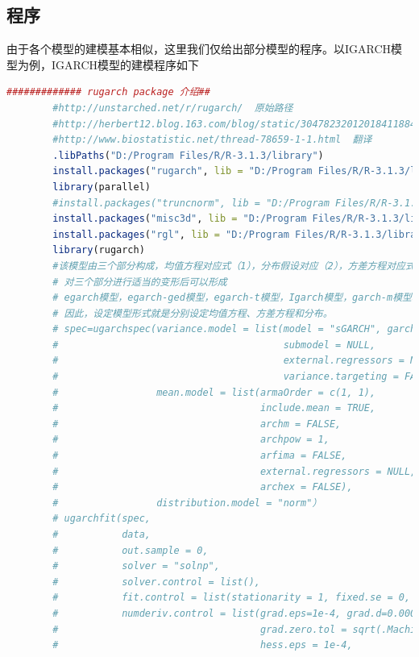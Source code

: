     \subsection{程序}
        由于各个模型的建模基本相似，这里我们仅给出部分模型的程序。以IGARCH模型为例，IGARCH模型的建模程序如下
        \begin{lstlisting}[language = R]
        ############# rugarch package 介绍##
        #http://unstarched.net/r/rugarch/  原始路径
        #http://herbert12.blog.163.com/blog/static/304782320120184118846/
        #http://www.biostatistic.net/thread-78659-1-1.html  翻译
        .libPaths("D:/Program Files/R/R-3.1.3/library")
        install.packages("rugarch", lib = "D:/Program Files/R/R-3.1.3/library")
        library(parallel)
        #install.packages("truncnorm", lib = "D:/Program Files/R/R-3.1.3/library")
        install.packages("misc3d", lib = "D:/Program Files/R/R-3.1.3/library")
        install.packages("rgl", lib = "D:/Program Files/R/R-3.1.3/library")
        library(rugarch)
        #该模型由三个部分构成，均值方程对应式（1），分布假设对应（2），方差方程对应式（3），
        # 对三个部分进行适当的变形后可以形成
        # egarch模型，egarch-ged模型，egarch-t模型，Igarch模型，garch-m模型和Qgarch模型等
        # 因此，设定模型形式就是分别设定均值方程、方差方程和分布。
        # spec=ugarchspec(variance.model = list(model = "sGARCH", garchOrder = c(1, 1),
        #                                       submodel = NULL,
        #                                       external.regressors = NULL,
        #                                       variance.targeting = FALSE),
        #                 mean.model = list(armaOrder = c(1, 1),
        #                                   include.mean = TRUE,
        #                                   archm = FALSE,
        #                                   archpow = 1,
        #                                   arfima = FALSE,
        #                                   external.regressors = NULL,
        #                                   archex = FALSE),
        #                 distribution.model = "norm"）
        # ugarchfit(spec,
        #           data,
        #           out.sample = 0,
        #           solver = "solnp",
        #           solver.control = list(),
        #           fit.control = list(stationarity = 1, fixed.se = 0, scale = 0, rec.init = 'all'),
        #           numderiv.control = list(grad.eps=1e-4, grad.d=0.0001,
        #                                   grad.zero.tol = sqrt(.Machine$double.eps/7e-7),
        #                                   hess.eps = 1e-4,

\end{lstlisting}

